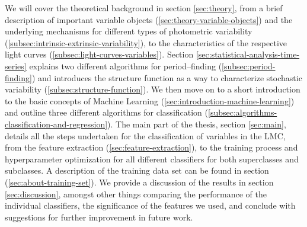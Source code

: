 We will cover the theoretical background in section \ref{sec:theory}, from a brief description of important variable objects (\ref{sec:theory-variable-objects}) and the underlying mechanisms for different types of photometric variability (\ref{subsec:intrinsic-extrinsic-variability}), to the characteristics of the respective light curves (\ref{subsec:light-curves-variables}). Section \ref{sec:statistical-analysis-time-series} explains two different algorithms for period--finding (\ref{subsec:period-finding}) and introduces the structure function as a way to characterize stochastic variability (\ref{subsec:structure-function}). We then move on to a short introduction to the basic concepts of Machine Learning (\ref{sec:introduction-machine-learning}) and outline three different algorithms for classification (\ref{subsec:algorithms-classification-and-regression}). The main part of the thesis, section \ref{sec:main}, details all the steps undertaken for the classification of variables in the LMC, from the feature extraction (\ref{sec:feature-extraction}), to the training process and hyperparameter optimization for all different classifiers for both superclasses and subclasses. A description of the training data set can be found in section (\ref{sec:about-training-set}). We provide a discussion of the results in section \ref{sec:discussion}, amongst other things comparing the performance of the individual classifiers, the significance of the features we used, and conclude with suggestions for further improvement in future work.